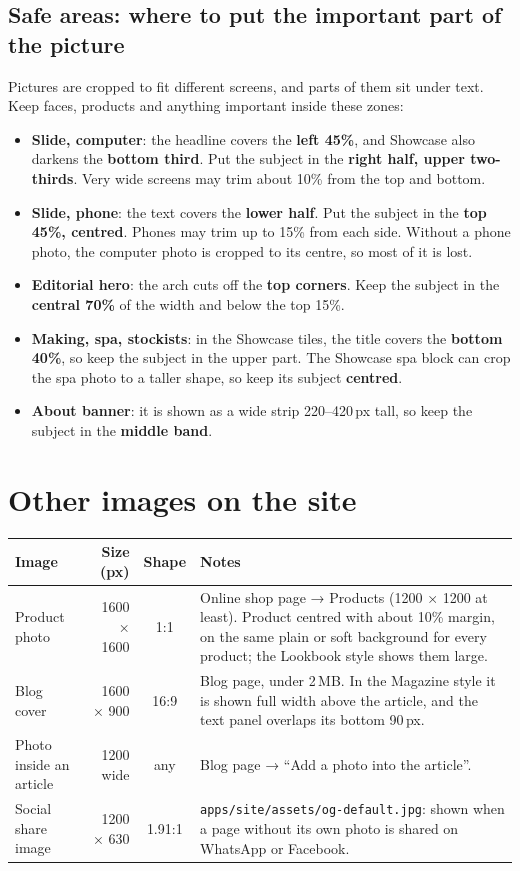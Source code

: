 \documentclass[11pt,a4paper]{article}
\newcommand{\key}[1]{\texttt{#1}}
\begin{document}
\subsection*{Safe areas: where to put the important part of the picture}
Pictures are cropped to fit different screens, and parts of them sit under text. Keep faces, products and anything important inside these zones:
\begin{itemize}
  \item \textbf{Slide, computer}: the headline covers the \textbf{left 45\%}, and Showcase also darkens the \textbf{bottom third}. Put the subject in the \textbf{right half, upper two-thirds}. Very wide screens may trim about 10\% from the top and bottom.
  \item \textbf{Slide, phone}: the text covers the \textbf{lower half}. Put the subject in the \textbf{top 45\%, centred}. Phones may trim up to 15\% from each side. Without a phone photo, the computer photo is cropped to its centre, so most of it is lost.
  \item \textbf{Editorial hero}: the arch cuts off the \textbf{top corners}. Keep the subject in the \textbf{central 70\%} of the width and below the top 15\%.
  \item \textbf{Making, spa, stockists}: in the Showcase tiles, the title covers the \textbf{bottom 40\%}, so keep the subject in the upper part. The Showcase spa block can crop the spa photo to a taller shape, so keep its subject \textbf{centred}.
  \item \textbf{About banner}: it is shown as a wide strip 220--420\,px tall, so keep the subject in the \textbf{middle band}.
\end{itemize}

\section{Other images on the site}
\begin{tabularx}{\textwidth}{@{}l r c L@{}}
\toprule
\textbf{Image} & \textbf{Size (px)} & \textbf{Shape} & \textbf{Notes} \\ \midrule
Product photo & 1600 × 1600 & 1:1 & Online shop page → Products (1200 × 1200 at least). Product centred with about 10\% margin, on the same plain or soft background for every product; the Lookbook style shows them large. \\
Blog cover & 1600 × 900 & 16:9 & Blog page, under 2\,MB. In the Magazine style it is shown full width above the article, and the text panel overlaps its bottom 90\,px. \\
Photo inside an article & 1200 wide & any & Blog page → ``Add a photo into the article''. \\
Social share image & 1200 × 630 & 1.91:1 & \key{apps/site/assets/og-default.jpg}: shown when a page without its own photo is shared on WhatsApp or Facebook. \\ \bottomrule
\end{tabularx}
\end{document}
